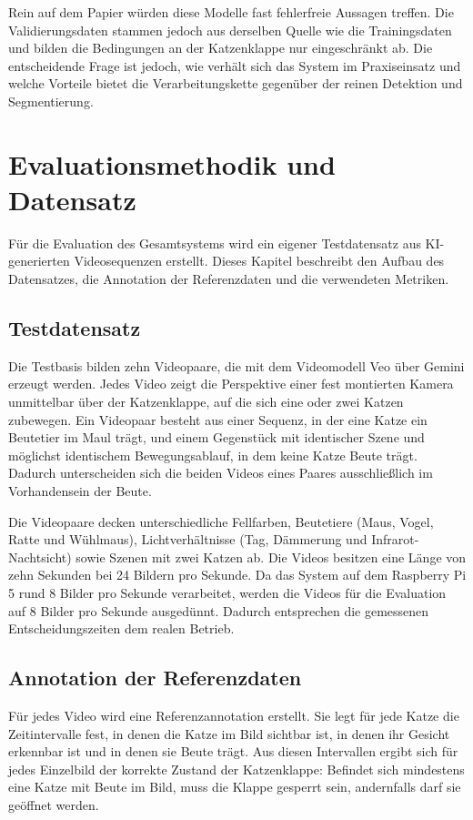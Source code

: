 Rein auf dem Papier würden diese Modelle fast fehlerfreie Aussagen treffen. Die Validierungsdaten stammen jedoch aus derselben Quelle wie die Trainingsdaten und bilden die Bedingungen an der Katzenklappe nur eingeschränkt ab. Die entscheidende Frage ist jedoch, wie verhält sich das System im Praxiseinsatz und welche Vorteile bietet die Verarbeitungskette gegenüber der reinen Detektion und Segmentierung.

\section{Evaluationsmethodik und Datensatz}
\label{sec:evaluationsmethodik}
Für die Evaluation des Gesamtsystems wird ein eigener Testdatensatz aus KI-generierten Videosequenzen erstellt. Dieses Kapitel beschreibt den Aufbau des Datensatzes, die Annotation der Referenzdaten und die verwendeten Metriken.

\subsection{Testdatensatz}
Die Testbasis bilden zehn Videopaare, die mit dem Videomodell Veo über Gemini \cite{geminiteam2023gemini} erzeugt werden. Jedes Video zeigt die Perspektive einer fest montierten Kamera unmittelbar über der Katzenklappe, auf die sich eine oder zwei Katzen zubewegen. Ein Videopaar besteht aus einer Sequenz, in der eine Katze ein Beutetier im Maul trägt, und einem Gegenstück mit identischer Szene und möglichst identischem Bewegungsablauf, in dem keine Katze Beute trägt. Dadurch unterscheiden sich die beiden Videos eines Paares ausschließlich im Vorhandensein der Beute.

Die Videopaare decken unterschiedliche Fellfarben, Beutetiere (Maus, Vogel, Ratte und Wühlmaus), Lichtverhältnisse (Tag, Dämmerung und Infrarot-Nachtsicht) sowie Szenen mit zwei Katzen ab. Die Videos besitzen eine Länge von zehn Sekunden bei 24 Bildern pro Sekunde. Da das System auf dem Raspberry Pi 5 rund 8 Bilder pro Sekunde verarbeitet, werden die Videos für die Evaluation auf 8 Bilder pro Sekunde ausgedünnt. Dadurch entsprechen die gemessenen Entscheidungszeiten dem realen Betrieb.

\subsection{Annotation der Referenzdaten}
Für jedes Video wird eine Referenzannotation erstellt. Sie legt für jede Katze die Zeitintervalle fest, in denen die Katze im Bild sichtbar ist, in denen ihr Gesicht erkennbar ist und in denen sie Beute trägt. Aus diesen Intervallen ergibt sich für jedes Einzelbild der korrekte Zustand der Katzenklappe: Befindet sich mindestens eine Katze mit Beute im Bild, muss die Klappe gesperrt sein, andernfalls darf sie geöffnet werden.

